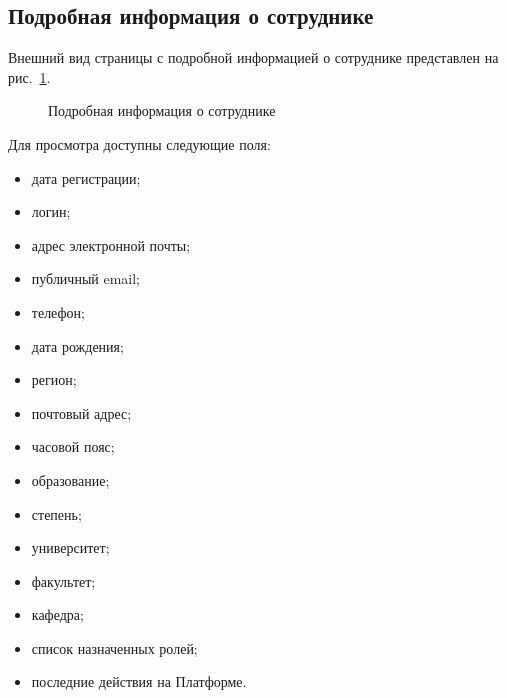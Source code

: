 \subsection{Подробная информация о сотруднике} \label{sec:employee_detail}
Внешний вид страницы с подробной информацией о сотруднике представлен на рис.~\ref{img:employee:employee_detail}.
\begin{figure}[H]
	\caption{Подробная информация о сотруднике}
	\label{img:employee:employee_detail}
\end{figure}

Для просмотра доступны следующие поля:
\begin{itemize}
	\item дата регистрации;
	\item логин;
	\item адрес электронной почты;
	\item публичный email;
	\item телефон;
	\item дата рождения;
	\item регион;
	\item почтовый адрес;
	\item часовой пояс;
	\item образование;
	\item степень;
	\item университет;
	\item факультет;
	\item кафедра;
	\item список назначенных ролей;
	\item последние действия на Платформе.
\end{itemize}

